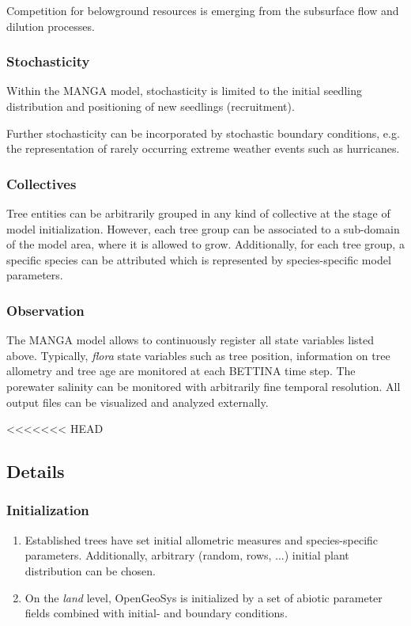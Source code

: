 Competition for belowground resources is emerging from the subsurface flow and dilution processes.
\subsubsection{Stochasticity}
Within the MANGA model, stochasticity is limited to the initial seedling distribution and positioning of new seedlings (recruitment).

Further stochasticity can be incorporated by stochastic boundary conditions, e.g. the representation of rarely occurring extreme weather events such as hurricanes.
\subsubsection{Collectives}
Tree entities can be arbitrarily grouped in any kind of collective at the stage of model initialization. 
However, each tree group can be associated to a sub-domain of the model area, where it is allowed to grow.
Additionally, for each tree group, a specific species can be attributed which is represented by species-specific model parameters.
\subsubsection{Observation}
The MANGA model allows to continuously register all state variables listed above.
Typically, \textit{flora} state variables such as tree position, information on tree allometry and tree age are monitored at each BETTINA time step.
The porewater salinity can be monitored with arbitrarily fine temporal resolution.
All output files can be visualized and analyzed externally.

<<<<<<< HEAD
\subsection*{Details}
\subsubsection{Initialization}

\begin{enumerate}
\item Established trees have set initial allometric measures and species-specific parameters.
Additionally, arbitrary (random, rows, ...) initial plant distribution can be chosen.
\item On the \textit{land} level, OpenGeoSys is initialized by a set of abiotic parameter fields combined with initial- and boundary conditions.
\end{enumerate}

